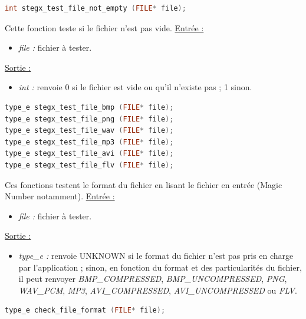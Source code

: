 \documentclass[11pt]{article}
\begin{document}
\begin{lstlisting}[language=c]
int stegx_test_file_not_empty (FILE* file);
\end{lstlisting}

Cette fonction teste si le fichier n'est pas vide. 
\newline
\underline{Entrée :}
\begin{itemize}
\item \textit{file :} fichier à tester.
\end{itemize}
\underline{Sortie :} 
\begin{itemize}
\item \textit{int :} renvoie 0 si le fichier est vide ou qu'il n'existe pas ; 1 sinon. 
\newline \end{itemize}

\begin{lstlisting}[language=c]
type_e stegx_test_file_bmp (FILE* file);
type_e stegx_test_file_png (FILE* file);
type_e stegx_test_file_wav (FILE* file);
type_e stegx_test_file_mp3 (FILE* file);
type_e stegx_test_file_avi (FILE* file);
type_e stegx_test_file_flv (FILE* file);
\end{lstlisting}

Ces fonctions testent le format du fichier en lisant le fichier en entrée 
(Magic Number notamment). 
\newline
\underline{Entrée :} 
\begin{itemize}
\item \textit{file :} fichier à tester. 
\end{itemize}
\underline{Sortie :} 
\begin{itemize}
\item \textit{type\_e :} renvoie UNKNOWN si le format du fichier n'est pas pris en 
charge par l'application ; sinon, en fonction du format et des particularités 
du fichier, il peut renvoyer \textit{BMP\_COMPRESSED}, \textit{BMP\_UNCOMPRESSED}, 
\textit{PNG}, \textit{WAV\_PCM}, \textit{MP3}, \textit{AVI\_COMPRESSED}, 
\textit{AVI\_UNCOMPRESSED} ou \textit{FLV}. 
\newline 
\end{itemize}

\begin{lstlisting}[language=c]
type_e check_file_format (FILE* file);
\end{lstlisting}
\end{document}
